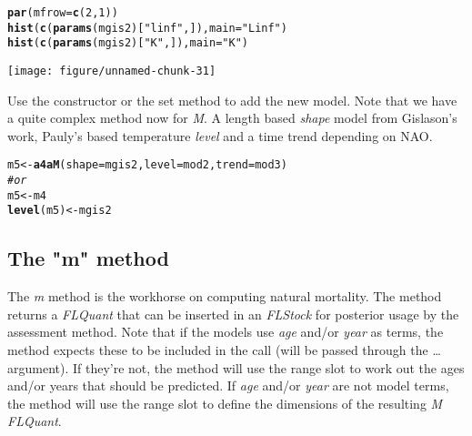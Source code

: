 \documentclass[a4paper,english,10pt]{article}\usepackage[]{graphicx}\usepackage[]{color}
\makeatletter
\def\maxwidth{ %
  \ifdim\Gin@nat@width>\linewidth
    \linewidth
  \else
    \Gin@nat@width
  \fi
}
\newcommand{\hlnum}[1]{\textcolor[rgb]{0.686,0.059,0.569}{#1}}%
\newcommand{\hlstr}[1]{\textcolor[rgb]{0.192,0.494,0.8}{#1}}%
\newcommand{\hlcom}[1]{\textcolor[rgb]{0.678,0.584,0.686}{\textit{#1}}}%
\newcommand{\hlstd}[1]{\textcolor[rgb]{0.345,0.345,0.345}{#1}}%
\newcommand{\hlkwb}[1]{\textcolor[rgb]{0.69,0.353,0.396}{#1}}%
\newcommand{\hlkwc}[1]{\textcolor[rgb]{0.333,0.667,0.333}{#1}}%
\newcommand{\hlkwd}[1]{\textcolor[rgb]{0.737,0.353,0.396}{\textbf{#1}}}%
\newenvironment{kframe}{%
 \def\at@end@of@kframe{}%
 \ifinner\ifhmode%
  \def\at@end@of@kframe{\end{minipage}}%
  \begin{minipage}{\columnwidth}%
 \fi\fi%
 \def\FrameCommand##1{\hskip\@totalleftmargin \hskip-\fboxsep
 \colorbox{shadecolor}{##1}\hskip-\fboxsep
     \hskip-\linewidth \hskip-\@totalleftmargin \hskip\columnwidth}%
 \MakeFramed {\advance\hsize-\width
   \@totalleftmargin\z@ \linewidth\hsize
   \@setminipage}}%
 {\par\unskip\endMakeFramed%
 \at@end@of@kframe}
\newenvironment{knitrout}{}{} %
\makeatother
\begin{document}
\begin{knitrout}
\color{fgcolor}\begin{kframe}
\begin{alltt}
\hlkwd{par}\hlstd{(}\hlkwc{mfrow} \hlstd{=} \hlkwd{c}\hlstd{(}\hlnum{2}\hlstd{,} \hlnum{1}\hlstd{))}
\hlkwd{hist}\hlstd{(}\hlkwd{c}\hlstd{(}\hlkwd{params}\hlstd{(mgis2)[}\hlstr{"linf"}\hlstd{, ]),} \hlkwc{main} \hlstd{=} \hlstr{"Linf"}\hlstd{)}
\hlkwd{hist}\hlstd{(}\hlkwd{c}\hlstd{(}\hlkwd{params}\hlstd{(mgis2)[}\hlstr{"K"}\hlstd{, ]),} \hlkwc{main} \hlstd{=} \hlstr{"K"}\hlstd{)}
\end{alltt}
\end{kframe}
\texttt{[image: figure/unnamed-chunk-31]} 

\end{knitrout}


Use the constructor or the set method to add the new model. Note that we have a quite complex method now for \emph{M}. A length based \emph{shape} model from Gislason's work, Pauly's based temperature \emph{level} and a time trend depending on NAO. 

\begin{knitrout}
\color{fgcolor}\begin{kframe}
\begin{alltt}
\hlstd{m5} \hlkwb{<-} \hlkwd{a4aM}\hlstd{(}\hlkwc{shape} \hlstd{= mgis2,} \hlkwc{level} \hlstd{= mod2,} \hlkwc{trend} \hlstd{= mod3)}
\hlcom{# or}
\hlstd{m5} \hlkwb{<-} \hlstd{m4}
\hlkwd{level}\hlstd{(m5)} \hlkwb{<-} \hlstd{mgis2}
\end{alltt}
\end{kframe}
\end{knitrout}


\subsection{The "m" method}

The \emph{m} method is the workhorse on computing natural mortality. The method returns a \emph{FLQuant} that can be inserted in an \emph{FLStock} for posterior usage by the assessment method. Note that if the models use \emph{age} and/or \emph{year} as terms, the method expects these to be included in the call (will be passed through the \ldots argument). If they're not, the method will use the range slot to work out the ages and/or years that should be predicted. If \emph{age} and/or \emph{year} are not model terms, the method will use the range slot to define the dimensions of the resulting \emph{M} \emph{FLQuant}.
\end{document}
